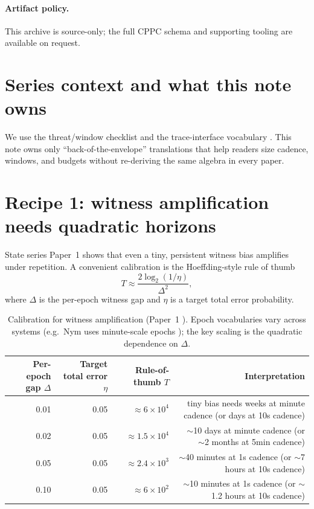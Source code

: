 \documentclass[11pt]{article}
\begin{document}
\paragraph{Artifact policy.}
This archive is source-only; the full CPPC schema and supporting tooling are available on request.\cite{series:artifactpolicy}


\section{Series context and what this note owns}
We use the threat/window checklist \cite{series:threatwindows} and the trace-interface vocabulary \cite{series:traceifaces}.
This note owns only ``back-of-the-envelope'' translations that help readers size cadence, windows, and budgets without re-deriving the same algebra in every paper.

\section{Recipe 1: witness amplification needs quadratic horizons}
State series Paper~1 \cite{state1} shows that even a tiny, persistent witness bias amplifies under repetition.
A convenient calibration is the Hoeffding-style rule of thumb
\[
T \approx \frac{2\log_2(1/\eta)}{\Delta^2},
\]
where $\Delta$ is the per-epoch witness gap and $\eta$ is a target total error probability.

\begin{table}[h]
\centering
\begin{tabular}{@{}rrrr@{}}
\toprule
Per-epoch gap $\Delta$ & Target total error $\eta$ & Rule-of-thumb $T$ & Interpretation \\
\midrule
0.01 & 0.05 & $\approx 6\times 10^4$ & tiny bias needs weeks at minute cadence (or days at 10s cadence) \\
0.02 & 0.05 & $\approx 1.5\times 10^4$ & $\sim$10 days at minute cadence (or $\sim$2 months at 5min cadence) \\
0.05 & 0.05 & $\approx 2.4\times 10^3$ & $\sim$40 minutes at 1s cadence (or $\sim$7 hours at 10s cadence) \\
0.10 & 0.05 & $\approx 6\times 10^2$ & $\sim$10 minutes at 1s cadence (or $\sim$1.2 hours at 10s cadence) \\
\bottomrule
\end{tabular}
\caption{Calibration for witness amplification (Paper~1 \cite{state1}). Epoch vocabularies vary across systems (e.g.\ Nym uses minute-scale epochs \cite{nym_cryptoecon_reward_sharing}); the key scaling is the quadratic dependence on $\Delta$.}
\label{tab:calibration}
\end{table}
\end{document}
